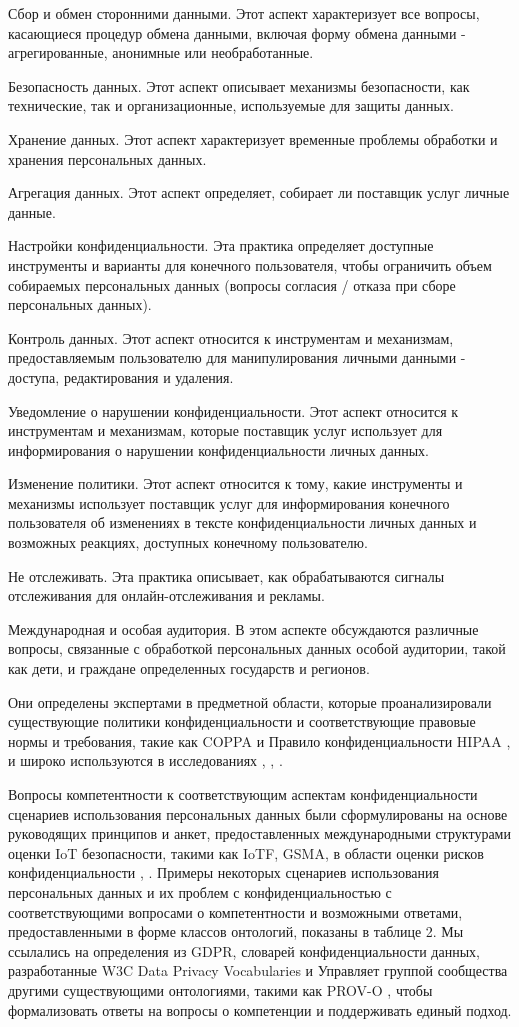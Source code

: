 \documentclass[../main]{subfiles}
\begin{document}
Сбор и обмен сторонними данными. Этот аспект характеризует все вопросы, касающиеся процедур обмена данными, включая форму обмена данными - агрегированные, анонимные или необработанные.

Безопасность данных. Этот аспект описывает механизмы безопасности, как технические, так и организационные, используемые для защиты данных.

Хранение данных. Этот аспект характеризует временные проблемы обработки и хранения персональных данных.

Агрегация данных. Этот аспект определяет, собирает ли поставщик услуг личные данные.

Настройки конфиденциальности. Эта практика определяет доступные инструменты и варианты для конечного пользователя, чтобы ограничить объем собираемых персональных данных (вопросы согласия / отказа при сборе персональных данных).

Контроль данных. Этот аспект относится к инструментам и механизмам, предоставляемым пользователю для манипулирования личными данными - доступа, редактирования и удаления.

Уведомление о нарушении конфиденциальности. Этот аспект относится к инструментам и механизмам, которые поставщик услуг использует для информирования о нарушении конфиденциальности личных данных.

Изменение политики. Этот аспект относится к тому, какие инструменты и механизмы использует поставщик услуг для информирования конечного пользователя об изменениях в тексте конфиденциальности личных данных и возможных реакциях, доступных конечному пользователю.

Не отслеживать. Эта практика описывает, как обрабатываются сигналы отслеживания для онлайн-отслеживания и рекламы.

Международная и особая аудитория. В этом аспекте обсуждаются различные вопросы, связанные с обработкой персональных данных особой аудитории, такой как дети, и граждане определенных государств и регионов.

Они определены экспертами в предметной области, которые проанализировали существующие политики конфиденциальности и соответствующие правовые нормы и требования, такие как COPPA \cite{MDPI2} и Правило конфиденциальности HIPAA \cite{MDPI3}, и широко используются в исследованиях \cite{MDPI6}, \cite{MDPI18}, \cite{MDPI8}.

Вопросы компетентности к соответствующим аспектам конфиденциальности сценариев использования персональных данных были сформулированы на основе руководящих принципов и анкет, предоставленных международными структурами оценки IoT безопасности, такими как IoTF, GSMA, в области оценки рисков конфиденциальности \cite{MDPI19}, \cite{MDPI20}. Примеры некоторых сценариев использования персональных данных и их проблем с конфиденциальностью с соответствующими вопросами о компетентности и возможными ответами, предоставленными в форме классов онтологий, показаны в таблице 2. Мы ссылались на определения из GDPR, словарей конфиденциальности данных, разработанные W3C Data Privacy Vocabularies и Управляет группой сообщества \cite{MDPI21} другими существующими онтологиями, такими как PROV-O \cite{MDPI22}, \cite{GDPR} чтобы формализовать ответы на вопросы о компетенции и поддерживать единый подход. 
\end{document}
